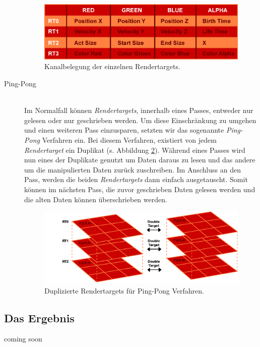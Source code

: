 \begin{Spacing}{\mylinespace}
\begin{description}
\begin{figure}[h!]
	\centering
	\vspace*{55px}
	\includegraphics[width=410px]{graphics/RendertargetsChannels.png}
	\caption{Kanalbelegung der einzelnen Rendertargets.}
	\label{fig:RTCahnnels}
\end{figure}	
	
	\item[Ping-Pong] \hfill \\
	Im Normalfall können \textit{Rendertargets}, innerhalb eines Passes, entweder nur gelesen oder nur geschrieben werden. Um diese Einschränkung zu umgehen und einen weiteren Pass einzusparen, setzten wir das sogenannte \textit{Ping-Pong} Verfahren ein. Bei diesem Verfahren, existiert von jedem \textit{Rendertarget} ein Duplikat (s. Abbildung \ref{fig:DoubleTarget}). Während eines Passes wird nun eines der Duplikate genutzt um Daten daraus zu lesen und das andere um die manipulierten Daten zurück zuschreiben. Im Anschluss an den Pass, werden die beiden \textit{Rendertargets} dann einfach ausgetauscht. Somit können im nächsten Pass, die zuvor geschrieben Daten gelesen werden und die alten Daten können überschrieben werden.
	
\begin{figure}[h!]
	\centering
	\vspace*{30px}
	\includegraphics[width=410px]{graphics/DoubleTargets2.png}
	\caption{Duplizierte Rendertargets für Ping-Pong Verfahren.}
	\label{fig:DoubleTarget}
\end{figure}
\end{description}

\subsection{Das Ergebnis}

coming soon

\end{Spacing}
\newpage
\clearpage
